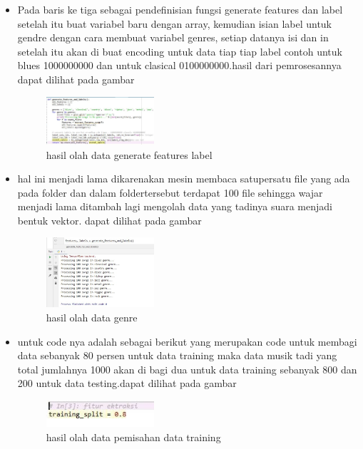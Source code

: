 \begin{enumerate}
\begin{itemize}
        \item  Pada baris ke tiga sebagai pendefinisian fungsi generate features dan label setelah itu buat variabel baru dengan array, kemudian isian label untuk gendre dengan cara membuat variabel genres, setiap datanya isi  dan in setelah itu akan di buat encoding untuk data tiap tiap label contoh untuk blues 1000000000 dan untuk clasical 0100000000.hasil dari pemrosesannya dapat dilihat pada gambar
        \begin{figure}[H]
            \includegraphics[width=4cm]{figures/1174039/chapter6/4.jpg}
            \centering
            \caption{hasil olah data generate features label}
        \end{figure}

        
        \item  hal ini menjadi lama dikarenakan mesin membaca satupersatu file yang ada pada folder dan dalam foldertersebut terdapat 100 file sehingga wajar menjadi lama ditambah lagi mengolah data yang tadinya suara menjadi bentuk vektor.  dapat dilihat pada gambar
        \begin{figure}[H]
            \includegraphics[width=4cm]{figures/1174039/chapter6/5.jpg}
            \centering
            \caption{hasil olah data genre}
        \end{figure}
        
        \item untuk code nya adalah sebagai berikut  yang merupakan code untuk membagi data sebanyak 80 persen untuk data training maka data musik tadi yang total jumlahnya 1000 akan di bagi dua untuk data training sebanyak 800  dan 200 untuk data testing.dapat dilihat pada gambar
        \begin{figure}[H]
            \includegraphics[width=4cm]{figures/1174039/chapter6/6.jpg}
            \centering
            \caption{hasil olah data pemisahan data training}
        \end{figure}
        

\end{itemize}
\end{enumerate}
